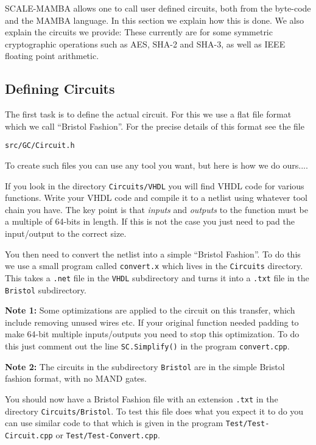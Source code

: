 \label{sec:GC}
SCALE-MAMBA allows one to call user defined circuits, both
from the byte-code and the MAMBA language.
In this section we explain how this is done.
We also explain the circuits we provide: These currently
are for some symmetric cryptographic operations such as
AES, SHA-2 and SHA-3, as well as IEEE floating point
arithmetic.


\subsection{Defining Circuits}
The first task is to define the actual circuit.
For this we use a flat file format which we call 
``Bristol Fashion''.
For the precise details of this format see the
file 
\begin{center}
\verb|src/GC/Circuit.h|
\end{center}
To create such files you can use any tool you want,
but here is how we do ours....

If you look in the directory \verb|Circuits/VHDL| you
will find VHDL code for various functions. Write your
VHDL code and compile it to a netlist using whatever
tool chain you have.
The key point is that {\em inputs} and {\em outputs}
to the function must be a multiple of 64-bits in length.
If this is not the case you just need to pad the
input/output to the correct size.

You then need to convert the netlist into a
simple ``Bristol Fashion''. To do this we use a small program
called \verb|convert.x| which lives in the 
\verb|Circuits| directory. This takes a \verb|.net|
file in the \verb|VHDL| subdirectory and turns it
into a \verb|.txt| file in the \verb|Bristol| subdirectory.


{\bf Note 1:} Some optimizations are applied to the
circuit on this transfer, which include removing unused
wires etc. If your original function needed padding to
make 64-bit multiple inputs/outputs you need to stop
this optimization. To do this just comment out the
line \verb|SC.Simplify()| in the program \verb|convert.cpp|.

{\bf Note 2:} The circuits in the subdirectory
\verb|Bristol| are in the simple Bristol fashion format,
with no MAND gates.

You should now have a Bristol Fashion file with an 
extension \verb|.txt| in the directory \verb|Circuits/Bristol|.
To test this file does what you expect it to do you
can use similar code to that which is given in the
program \verb|Test/Test-Circuit.cpp| or
\verb|Test/Test-Convert.cpp|.

